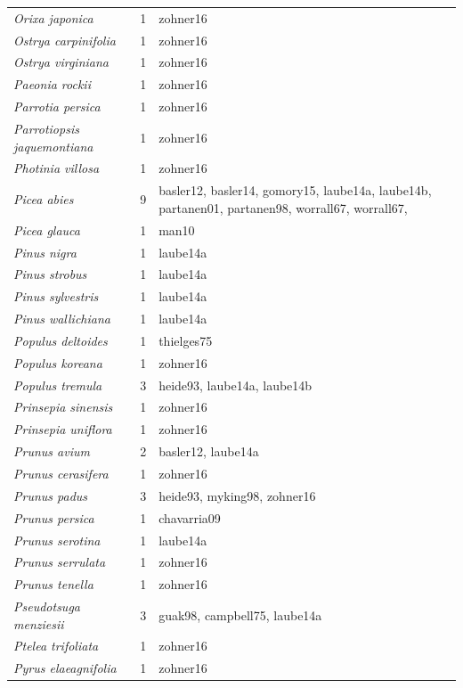 \documentclass{article}
\begin{document}
\begin{footnotesize}
\begin{longtable}{p{}p{}p{}}
  \textit{Orixa japonica} &   1 & zohner16 \\ 
  \textit{Ostrya carpinifolia} &   1 & zohner16 \\ 
  \textit{Ostrya virginiana} &   1 & zohner16 \\ 
  \textit{Paeonia rockii} &   1 & zohner16 \\ 
  \textit{Parrotia persica} &   1 & zohner16 \\ 
  \textit{Parrotiopsis jaquemontiana} &   1 & zohner16 \\ 
  \textit{Photinia villosa} &   1 & zohner16 \\ 
  \textit{Picea abies} &   9 & basler12, basler14, gomory15, laube14a, laube14b, partanen01, partanen98, worrall67, worrall67,  \\ 
  \textit{Picea glauca} &   1 & man10 \\ 
  \textit{Pinus nigra} &   1 & laube14a \\ 
  \textit{Pinus strobus} &   1 & laube14a \\ 
  \textit{Pinus sylvestris} &   1 & laube14a \\ 
  \textit{Pinus wallichiana} &   1 & laube14a \\ 
  \textit{Populus deltoides} &   1 & thielges75 \\ 
  \textit{Populus koreana} &   1 & zohner16 \\ 
  \textit{Populus tremula} &   3 & heide93, laube14a, laube14b \\ 
  \textit{Prinsepia sinensis} &   1 & zohner16 \\ 
  \textit{Prinsepia uniflora} &   1 & zohner16 \\ 
  \textit{Prunus avium} &   2 & basler12, laube14a \\ 
  \textit{Prunus cerasifera} &   1 & zohner16 \\ 
  \textit{Prunus padus} &   3 & heide93, myking98, zohner16 \\ 
  \textit{Prunus persica} &   1 & chavarria09 \\ 
  \textit{Prunus serotina} &   1 & laube14a \\ 
  \textit{Prunus serrulata} &   1 & zohner16 \\ 
  \textit{Prunus tenella} &   1 & zohner16 \\ 
  \textit{Pseudotsuga menziesii} &   3 & guak98, campbell75, laube14a \\ 
  \textit{Ptelea trifoliata} &   1 & zohner16 \\ 
  \textit{Pyrus elaeagnifolia} &   1 & zohner16 \\ 

\end{longtable}
\end{footnotesize}
\end{document}
